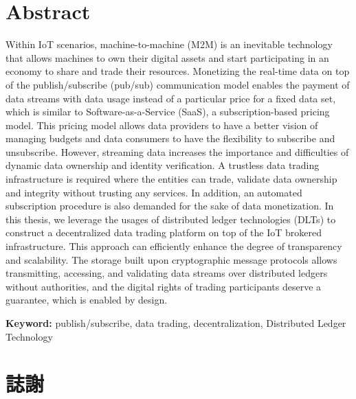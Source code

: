 \newpage
{}
\chapter*{Abstract}
\pagestyle{plain}

\begin{spacing}{2.0}

Within IoT scenarios, machine-to-machine (M2M) is an inevitable technology that allows machines to own their digital assets and start participating in an economy to share and trade their resources. Monetizing the real-time data on top of the publish/subscribe (pub/sub) communication model enables the payment of data streams with data usage instead of a particular price for a fixed data set, which is similar to Software-as-a-Service (SaaS), a subscription-based pricing model. This pricing model allows data providers to have a better vision of managing budgets and data consumers to have the flexibility to subscribe and unsubscribe. However, streaming data increases the importance and difficulties of dynamic data ownership and identity verification. A trustless data trading infrastructure is required where the entities can trade, validate data ownership and integrity without trusting any services. In addition, an automated subscription procedure is also demanded for the sake of data monetization. In this thesis, we leverage the usages of distributed ledger technologies (DLTs) to construct a decentralized data trading platform on top of the IoT brokered infrastructure. This approach can efficiently enhance the degree of transparency and scalability. The storage built upon cryptographic message protocols allows transmitting, accessing, and validating data streams over distributed ledgers without authorities, and the digital rights of trading participants deserve a guarantee, which is enabled by design.

\end{spacing}

\par{\noindent \bf Keyword:}{ publish/subscribe, data trading, decentralization, Distributed Ledger Technology }
\clearpage
{}


\newpage
{}
\chapter*{誌謝}
\pagestyle{plain}

